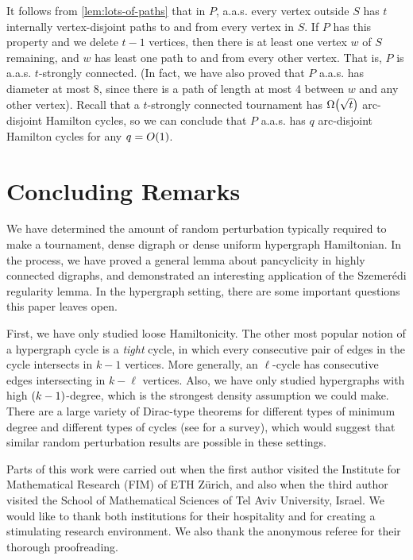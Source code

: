 \documentclass[11pt,english]{article}
\theoremstyle{plain}
\theoremstyle{definition}
\theoremstyle{definition}
\theoremstyle{plain}
\theoremstyle{plain}
\theoremstyle{plain}
\theoremstyle{plain}
\theoremstyle{remark}
\theoremstyle{remark}
\let\originalleft\left
\let\originalright\right
\renewcommand{\left}{\mathopen{}\mathclose\bgroup\originalleft}
\renewcommand{\right}{\aftergroup\egroup\originalright}
\begin{document}
It follows from \ref{lem:lots-of-paths} that in $P$, a.a.s.{} every vertex
outside $S$ has $t$ internally vertex-disjoint paths to and from every vertex in $S$.
If $P$ has this property and we delete $t-1$ vertices, then there is at least one vertex $w$
of $S$ remaining, and $w$ has least one path to and from every other
vertex. That is, $P$ is a.a.s.{} $t$-strongly connected. (In fact, we have also
proved that $P$ a.a.s.{} has diameter at most 8, since there is a path of length at most 4 between $w$ and any other vertex). Recall that a $t$-strongly connected tournament has $\Omega\left(\sqrt t\right)$ arc-disjoint Hamilton cycles, so we can conclude that $P$ a.a.s.{} has $q$ arc-disjoint Hamilton cycles for any $q=O\left(1\right)$.


\section{Concluding Remarks}

We have determined the amount of random perturbation typically required to make
a tournament, dense digraph or dense uniform hypergraph Hamiltonian. In
the process, we have proved a general lemma about pancyclicity in
highly connected digraphs, and demonstrated an interesting application
of the Szemer\'edi regularity lemma. In the hypergraph setting, there are some important questions
this paper leaves open.

First, we have only studied loose Hamiltonicity. The other most popular
notion of a hypergraph cycle is a \emph{tight} cycle, in which every
consecutive pair of edges in the cycle intersects in $k-1$ vertices.
More generally, an $\ell$-cycle has consecutive edges intersecting
in $k-\ell$ vertices. Also, we have only studied hypergraphs with
high $\left(k-1\right)$-degree, which is the strongest density assumption
we could make. There are a large variety of Dirac-type theorems for
different types of minimum degree and different types of cycles (see
\cite{RR10} for a survey), which would suggest that similar random
perturbation results are possible in these settings.

\medskip

 Parts of this work were carried out when the first author visited the Institute for Mathematical Research (FIM) of ETH Z\"urich, and also when the third author visited the School of Mathematical Sciences of Tel Aviv University, Israel. We would like to thank both institutions for their hospitality and for creating a stimulating research environment. We also thank the anonymous referee for their thorough proofreading.
\end{document}
